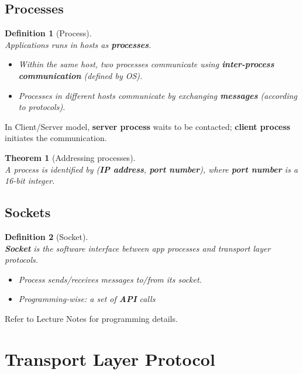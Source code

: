 \documentclass[12pt]{article}
\newtheorem{definition}{Definition}[section]
\newtheorem{theorem}{Theorem}[section]
\theoremstyle{definition}
\begin{document}
\subsection{Processes}
\begin{definition}[Process]
\hfill\\\normalfont Applications runs in hosts as \textbf{processes}.
\begin{itemize}
  \item Within the \textit{same} host, two processes communicate using \textbf{inter-process communication} (defined by OS).
  \item Processes in \textit{different} hosts communicate by exchanging \textbf{messages} (according to protocols).
\end{itemize}
\end{definition}
In Client/Server model, \textbf{server process} waits to be contacted; \textbf{client process} initiates the communication.
\begin{theorem}[Addressing processes]
\hfill\\\normalfont A process is identified by (\textbf{IP address}, \textbf{port number}), where \textbf{port number} is a 16-bit integer.
\end{theorem}
\clearpage
\subsection{Sockets}
\begin{definition}[Socket]
\hfill\\\normalfont \textbf{Socket} is the software interface between app processes and transport layer protocols.
\begin{itemize}
  \item Process sends/receives messages to/from its socket.
  \item Programming-wise: a set of \textbf{API} calls
\end{itemize}
\end{definition}
Refer to Lecture Notes for programming details.
\clearpage
\section{Transport Layer Protocol}
\end{document}
